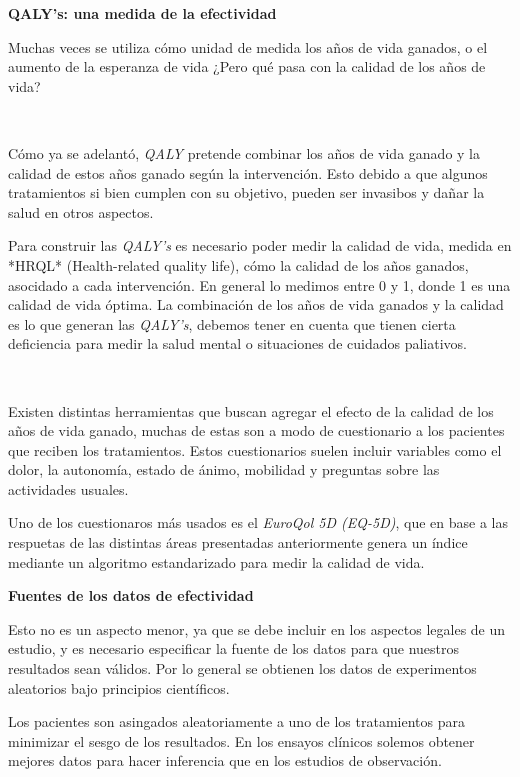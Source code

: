 \documentclass{article}
\begin{document}
\begin{center}
    \textbf{QALY's: una medida de la efectividad}
\end{center}

Muchas veces se utiliza cómo unidad de medida los años de vida ganados, o el aumento de la esperanza de vida ¿Pero qué pasa con la calidad de los años de vida?

\

Cómo ya se adelantó, \textit{QALY} pretende combinar los años de vida ganado y la calidad de estos años ganado según la intervención. Esto debido a que algunos tratamientos si bien cumplen con su objetivo, pueden ser invasibos y dañar la salud en otros aspectos.

Para construir las \textit{QALY's} es necesario poder medir la calidad de vida, medida en *HRQL* (Health-related quality life), cómo la calidad de los años ganados, asocidado a cada intervención. En general lo medimos entre 0 y 1, donde 1 es una calidad de vida óptima.
La combinación de los años de vida ganados y la calidad es lo que generan las \textit{QALY's}, debemos tener en cuenta que tienen cierta deficiencia para medir la salud mental o situaciones de cuidados paliativos.

\

Existen distintas herramientas que buscan agregar el efecto de la calidad de los años de vida ganado, muchas de estas son a modo de cuestionario a los pacientes que reciben los tratamientos.
Estos cuestionarios suelen incluir variables como el dolor, la autonomía, estado de ánimo, mobilidad y preguntas sobre las actividades usuales.

Uno de los cuestionaros más usados es el \textit{EuroQol 5D (EQ-5D)}, que en base a las respuetas de las distintas áreas presentadas anteriormente genera un índice mediante un algoritmo estandarizado para medir la calidad de vida.

\begin{center}
    \textbf{Fuentes de los datos de efectividad}
\end{center}

Esto no es un aspecto menor, ya que se debe incluir en los aspectos legales de un estudio, y es necesario especificar la fuente de los datos para que nuestros resultados sean válidos.
Por lo general se obtienen los datos de experimentos aleatorios bajo principios científicos.

Los pacientes son asingados aleatoriamente a uno de los tratamientos para minimizar el sesgo de los resultados.
En los ensayos clínicos solemos obtener mejores datos para hacer inferencia que en los estudios de observación.
\end{document}

